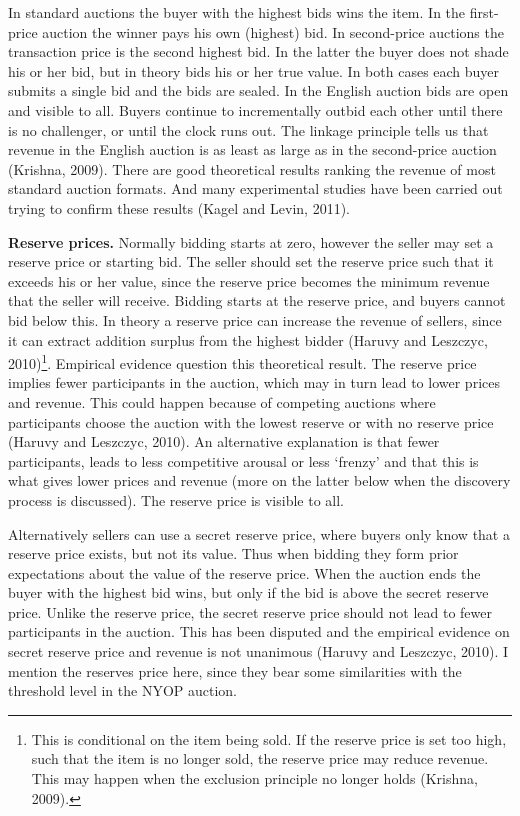 \documentclass[a4paper,12pt]{article}
\begin{document}
	In standard auctions the buyer with the highest bids wins the item. In the first-price auction the winner pays his own (highest) bid. In second-price auctions the transaction price is the second highest bid. In the latter the buyer does not shade his or her bid, but in theory bids his or her true value. In both cases each buyer submits a single bid and the bids are sealed. In the English auction bids are open and visible to all. Buyers continue to incrementally outbid each other until there is no challenger, or until the clock runs out. The linkage principle tells us that revenue in the English auction is as least as large as in the second-price auction (Krishna, 2009). There are good theoretical results ranking the revenue of most standard auction formats. And many experimental studies have been carried out trying to confirm these results (Kagel and Levin, 2011). 

	{\bf Reserve prices.} Normally bidding starts at zero, however the seller may set a reserve price or starting bid. The seller should set the reserve price such that it exceeds his or her value, since the reserve price becomes the minimum revenue that the seller will receive. Bidding starts at the reserve price, and buyers cannot bid below this. In theory a reserve price can increase the revenue of sellers, since it can extract addition surplus from the highest bidder (Haruvy and Leszczyc, 2010)\footnote{This is conditional on the item being sold. If the reserve price is set too high, such that the item is no longer sold, the reserve price may reduce revenue. This may happen when the exclusion principle no longer holds (Krishna, 2009).}. Empirical evidence question this theoretical result. The reserve price implies fewer participants in the auction, which may in turn lead to lower prices and revenue. This could happen because of competing auctions where participants choose the auction with the lowest reserve or with no reserve price (Haruvy and Leszczyc, 2010). An alternative explanation is that fewer participants, leads to less competitive arousal or less `frenzy' and that this is what gives lower prices and revenue (more on the latter below when the discovery process is discussed). The reserve price is visible to all. 

	Alternatively sellers can use a secret reserve price, where buyers only know that a reserve price exists, but not its value. Thus when bidding they form prior expectations about the value of the reserve price. When the auction ends the buyer with the highest bid wins, but only if the bid is above the secret reserve price. Unlike the reserve price, the secret reserve price should not lead to fewer participants in the auction. This has been disputed and the empirical evidence on secret reserve price and revenue is not unanimous (Haruvy and Leszczyc, 2010). I mention the reserves price here, since they bear some similarities with the threshold level in the NYOP auction.
\end{document}
